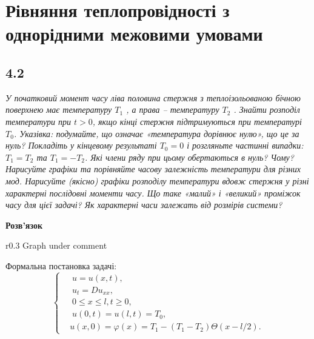 \documentclass[a4paper, 14pt]{extreport}
\begin{document}
\setcounter{chapter}{3}

\chapter{Рівняння теплопровідності з однорідними межовими умовами}

\section[Задача №4.2]{4.2}

\textit{У початковий момент часу ліва половина стержня з теплоізольованою бічною поверхнею має температуру $T_1$ , а права -- температуру $T_2$ . Знайти розподіл температури при $t> 0$, якщо кінці стержня підтримуються при температурі $T_0$. Указівка: подумайте, що означає «температура дорівнює нулю», що це за нуль? Покладіть у кінцевому результаті $T_0 = 0$ і розгляньте частинні випадки: $T_1 = T_2$ та $T_1 = -T_2$. Які члени ряду при цьому обертаються в нуль? Чому? Нарисуйте графіки та порівняйте часову залежність температури для     різних мод. Нарисуйте (якісно) графіки розподілу     температури вдовж стержня у різні характерні послідовні моменти часу. Що таке «малий» і «великий» проміжок часу для цієї задачі? Як характерні часи залежать від розмірів системи?}

\begin{center}
    \textbf{Розв'язок}
\end{center}

\begin{wrapfigure}{r}{0.3\textwidth}
    \centering
    Graph under comment
\end{wrapfigure}


Формальна постановка задачі:
\begin{equation} \label{probcond7}
    \left\{ \begin{aligned}
        &\;u = u(x,t), \\
        &\;u_{t} = D u_{xx}, \\
        &\;0 \leq x \leq l, t \geq 0, \\
        &\;u(0,t) = u(l,t) = T_0,\\
        &u(x,0) = \varphi(x) = T_1 - (T_1 - T_2)\Theta(x - l/2).
    \end{aligned} \right.
\end{equation}
\vspace{1cm}
\end{document}
